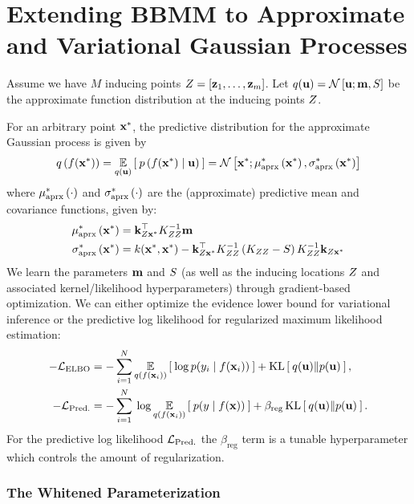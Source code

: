 \chapter{Extending BBMM to Approximate and Variational Gaussian Processes}
\label{chapter:variational}

Assume we have $M$ inducing points $Z = [\mathbf{z}_1, \ldots, \mathbf{z}_m]$.
Let $q(\mathbf{u}) = \mathcal{N} \left[ \mathbf{u}; \mathbf{m}, S \right]$ be the approximate function distribution at the inducing points $Z$.

For an arbitrary point $\mathbf{x}^*$, the predictive distribution for the approximate Gaussian process is given by
%
\begin{equation}
  q \left( f(\mathbf{x}^*) \right) = \operatorname*{\mathbb{E}}_{q(\mathbf{u})} \left[  \: p\left( f(\mathbf{x}^*) \mid \mathbf{u} \right) \:  \right]
  = \mathcal{N} \left[  \mathbf{x}^*; \mu^*_\text{aprx} \left(  \mathbf{x}^*  \right),  \sigma^*_\text{aprx} \left(  \mathbf{x}^*  \right) \right]
  \label{eqn:approx_pred}
\end{equation}
%
where $\mu^*_\text{aprx} \left( \cdot \right)$ and $\sigma^*_\text{aprx} \left( \cdot \right)$ are the (approximate) predictive mean and covariance functions, given by:
%
\begin{align}
  \mu^*_\text{aprx} \left( \mathbf{x}^* \right) &= \mathbf{k}_{Z\mathbf{x}^*}^\top K_{ZZ}^{-1} \mathbf{m}
  \label{eqn:approx_pred_mean} \\
  \sigma^*_\text{aprx} \left( \mathbf{x}^* \right) &= k(\mathbf{x}^*, \mathbf{x}^*) -
    \mathbf{k}_{Z\mathbf{x}^*}^\top K_{ZZ}^{-1} \left( K_{ZZ} - S \right) K_{ZZ}^{-1} \mathbf{k}_{Z\mathbf{x}^*}
  \label{eqn:approx_pred_covar}
\end{align}
%
We learn the parameters $\mathbf{m}$ and $S$ (as well as the inducing locations $Z$ and associated kernel/likelihood hyperparameters) through gradient-based optimization.
We can either optimize the evidence lower bound \cite{hensman2015scalable} for variational inference or the predictive log likelihood \cite{jankowiak2020parametric} for regularized maximum likelihood estimation:
%
\begin{align}
	-\mathcal L_\text{ELBO} &= -\sum_{i=1}^N \operatorname*{\mathbb{E}}_{q(f(\mathbf{x}_i))} \left[   \: \log p( y_i \mid f(\mathbf{x}_i) ) \:  \right] + \operatorname*{KL} \left[ \:  q(\mathbf{u})  \Vert  p(\mathbf{u})  \: \right],
	\label{eqn:elbo}
	\\
	-\mathcal L_\text{Pred.} &= -\sum_{i=1}^N \: \log \operatorname*{\mathbb{E}}_{q(f(\mathbf{x}_i))} \left[   \: p( y \mid f(\mathbf{x}) ) \:  \right] + \beta_\text{reg} \operatorname*{KL} \left[ \:  q(\mathbf{u})  \Vert  p(\mathbf{u})  \: \right].
	\label{eqn:predll}
\end{align}
%
For the predictive log likelihood $\mathcal L_\text{Pred.}$ the $\beta_\text{reg}$ term is a tunable hyperparameter which controls the amount of regularization.



\subsection{The Whitened Parameterization}

